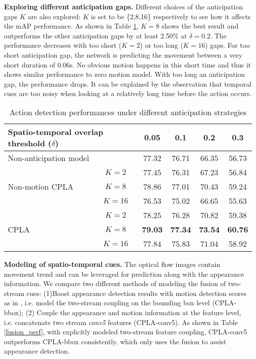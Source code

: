 \documentclass{bmvc2k}
\begin{document}
\textbf{Exploring different anticipation gaps.} Different choices of the anticipation gaps $K$ are also explored: $K$ is set to be \{2,8,16\} respectively to see how it affects the mAP performance. As shown in Table \ref{predictive_perf}, $K = 8$ shows the best result and outperforms the other anticipation gaps by at least 2.50\% at $\delta=0.2$. The performance decreases with too short ($K=2$) or too long ($K=16$) gaps. For too short anticipation gap, the network is predicting the movement between a very short duration of 0.06s. No obvious motion happens in this short time and thus it shows similar performance to zero motion model. With too long an anticipation gap, the performance drops. It can be explained by the observation that temporal cues are too noisy when looking at a relatively long time before the action occurs.


\begin{table}[!htbp]
\centering
\caption{Action detection performances under different anticipation strategies}
\label{predictive_perf}
\begin{tabular}{l|c|cccc}
\hline
\multicolumn{2}{l}{Spatio-temporal overlap threshold ($\delta$)}                    & 0.05  & 0.1   & 0.2   & 0.3   \\ \hline
\multicolumn{2}{l|}{Non-anticipation model}                              & 77.32 & 76.71 & 66.35 & 56.73 \\ \hline
\multicolumn{1}{l|}{\multirow{3}{*}{Non-motion CPLA}} & $K=2$  & 77.45 & 76.31 & 67.23 & 56.84 \\ \cline{2-6} 
\multicolumn{1}{l|}{}                                              & $K=8$ & 78.86 & 77.01 & 70.43 & 59.24 \\ \cline{2-6} 
\multicolumn{1}{l|}{}                                              & $K=16$ & 76.53 & 75.02 & 66.65 & 55.63 \\ \hline
\multicolumn{1}{l|}{\multirow{3}{*}{CPLA}}           & $K=2$  & 78.25 & 76.28 & 70.82 & 59.38 \\ \cline{2-6} 
\multicolumn{1}{l|}{}                                              & $K=8$ & \textbf{79.03} & \textbf{77.34} & \textbf{73.54} & \textbf{60.76} \\ \cline{2-6} 
\multicolumn{1}{l|}{}                                              & $K=16$ & 77.84 & 75.83 & 71.04 & 58.92 \\ \hline
\end{tabular}
\end{table}

\textbf{Modeling of spatio-temporal cues.} 
The optical flow images contain movement trend and can be leveraged for prediction along with the appearance information. We compare two different methods of modeling the fusion of two-stream cues: (1)Boost appearance detection results with motion detection scores as in \cite{suman16bmvc}, i.e. model the two-stream coupling on the bounding box level (CPLA-bbox); (2) Couple the appearance and motion information at the feature level, i.e. concatenate two stream \textit{conv5} features (CPLA-conv5). As shown in Table \ref{fusion_perf}, with explicitly modeled two-stream feature coupling, CPLA-conv5 outperforms CPLA-bbox consistently, which only uses the fusion to assist appearance detection.
\end{document}
